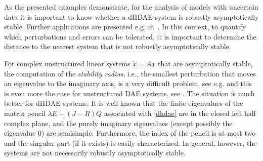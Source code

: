 \documentclass[11pt]{article}
\begin{document}
As the presented examples demonstrate, for the analysis of models with uncertain data it is important to know whether a dHDAE system is robustly asymptotically stable. Further applications are presented e.g. in~\cite{GraMQSV16,Mar86,MarL90,MarPR07,RomM09,Sch90}. In this context, to quantify which perturbations and errors can be tolerated, it is important to determine the distance to the nearest system that is not robustly asymptotically stable.


For complex unstructured linear systems $\dot x=Ax$ that are asymptotically stable,
the computation of the \emph{stability radius}, i.e., the smallest perturbation that moves an eigenvalue to the imaginary axis, is a very difficult problem, see e.g. \cite{Bye88} and this is even more  the case for unstructured DAE systems, see \cite{ByeN93,DuLM13}.
The situation is  much better for  dHDAE systems. It is well-known \cite{MehMW18} that the finite eigenvalues of the matrix pencil  $\lambda E-(J-R)Q$ associated with \eqref{dhdae} are in the closed left half complex plane, and the purely imaginary eigenvalues (except possibly the eigenvalue $0$) are semisimple. Furthermore, the index of the pencil is at most two and the singular part (if it exists) is easily characterized.
In general, however, the systems are  not necessarily robustly asymptotically stable.
\end{document}
